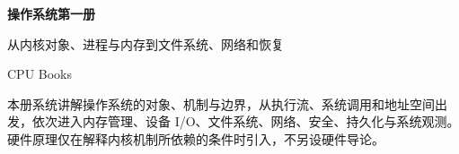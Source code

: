 \begin{titlepage}
\thispagestyle{empty}
\vspace*{2.25cm}
{\Huge\bfseries\color{BookNavy} 操作系统第一册\par}
\vspace{0.72cm}
{\Large\color{BookAccent} 从内核对象、进程与内存到文件系统、网络和恢复\par}
\vspace{1.18cm}
{\large CPU Books\par}
\vfill
{\small\color{BookMuted} 本册系统讲解操作系统的对象、机制与边界，从执行流、系统调用和地址空间出发，依次进入内存管理、设备 I/O、文件系统、网络、安全、持久化与系统观测。硬件原理仅在解释内核机制所依赖的条件时引入，不另设硬件导论。\par}
\end{titlepage}
